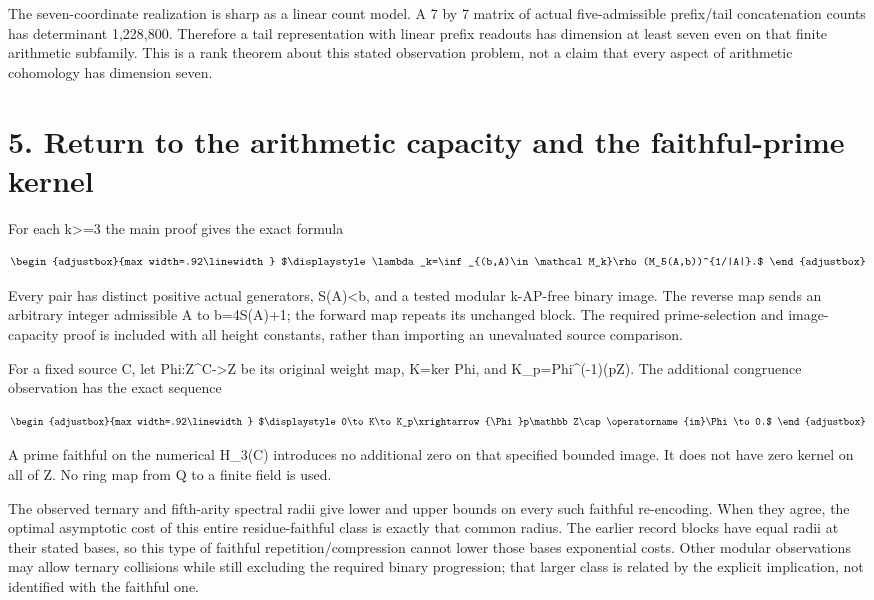 The seven-coordinate realization is sharp as a linear count model. A 7 by 7 matrix of actual five-admissible prefix/tail concatenation counts has determinant 1,228,800. Therefore a tail representation with linear prefix readouts has dimension at least seven even on that finite arithmetic subfamily. This is a rank theorem about this stated observation problem, not a claim that every aspect of arithmetic cohomology has dimension seven.

\section{5. Return to the arithmetic capacity and the faithful-prime kernel}\label{n25-return-to-the-arithmetic-capacity-and-the-faithful-prime-kernel}

For each k\textgreater=3 the main proof gives the exact formula

\[
\begin{adjustbox}{max width=.92\linewidth}
$\displaystyle \lambda_k=\inf_{(b,A)\in\mathcal M_k}\rho(M_5(A,b))^{1/|A|}.$
\end{adjustbox}
\]

Every pair has distinct positive actual generators, S(A)\textless b, and a tested modular k-AP-free binary image. The reverse map sends an arbitrary integer admissible A to b=4S(A)+1; the forward map repeats its unchanged block. The required prime-selection and image-capacity proof is included with all height constants, rather than importing an unevaluated source comparison.

For a fixed source C, let Phi:Z\^{}C-\textgreater Z be its original weight map, K=ker Phi, and K\_p=Phi\^{}(-1)(pZ). The additional congruence observation has the exact sequence

\[
\begin{adjustbox}{max width=.92\linewidth}
$\displaystyle 0\to K\to K_p\xrightarrow{\Phi}p\mathbb Z\cap\operatorname{im}\Phi\to0.$
\end{adjustbox}
\]

A prime faithful on the numerical H\_3(C) introduces no additional zero on that specified bounded image. It does not have zero kernel on all of Z. No ring map from Q to a finite field is used.

The observed ternary and fifth-arity spectral radii give lower and upper bounds on every such faithful re-encoding. When they agree, the optimal asymptotic cost of this entire residue-faithful class is exactly that common radius. The earlier record blocks have equal radii at their stated bases, so this type of faithful repetition/compression cannot lower those bases\textquotesingle{} exponential costs. Other modular observations may allow ternary collisions while still excluding the required binary progression; that larger class is related by the explicit implication, not identified with the faithful one.

